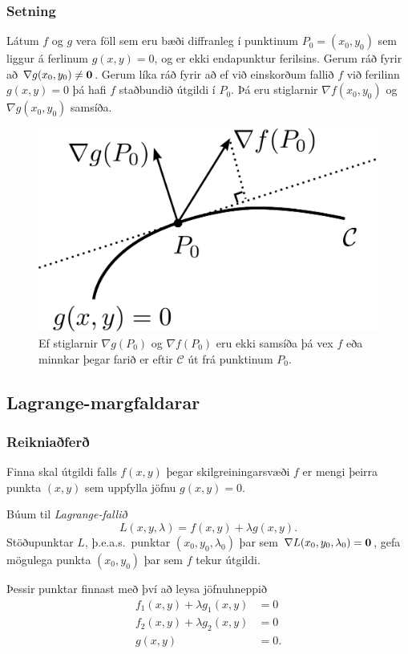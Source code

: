 \subsubsection{Setning  }
Látum $f$ og $g$ vera föll sem eru bæði
diffranleg í punktinum $P_0=(x_0,y_0)$ sem liggur á ferlinum
$g(x,y)=0$, og er ekki endapunktur ferilsins.  Gerum ráð fyrir að
$\nabla g(x_0,y_0)\neq \mbox{${\bf 0}$}$.  Gerum líka ráð fyrir að ef við einskorðum fallið $f$ við ferilinn $g(x,y)=0$ þá hafi $f$ staðbundið útgildi í $P_0$.  Þá eru stiglarnir $\nabla f(x_0,y_0)$ og $\nabla g(x_0,y_0)$ samsíða.


\begin {figure}[h!]
 \centering
            \includegraphics[width=.4\linewidth]{lagrange1}
            \caption*{Ef stiglarnir $\nabla g(P_0)$ og $\nabla f(P_0)$ eru ekki samsíða þá vex $f$ eða minnkar þegar farið er eftir $\mathcal{C}$ út frá punktinum $P_0$.}
\end {figure}



\subsection{Lagrange-margfaldarar} 

\subsubsection{Reikniaðferð  }
  Finna skal útgildi falls $f(x,y)$ þegar skilgreiningarsvæði $f$ er mengi þeirra punkta $(x,y)$ sem uppfylla jöfnu $g(x,y)=0$.  

\medskip
Búum til {\em Lagrange-fallið}
$$L(x,y,\lambda)=f(x,y)+\lambda g(x,y).$$
Stöðupunktar $L$, þ.e.a.s.~punktar $(x_0,y_0,\lambda_0)$ þar sem $\nabla L(x_0,y_0,\lambda_0)=\mbox{${\bf 0}$}$, gefa mögulega punkta $(x_0,y_0)$ þar sem $f$ tekur útgildi.

\medskip
Þessir punktar finnast með því að leysa jöfnuhneppið
\begin{align*}
f_1(x,y)+\lambda g_1(x,y)&=0\\
f_2(x,y)+\lambda g_2(x,y)&=0\\
g(x,y)&=0.
\end{align*}

